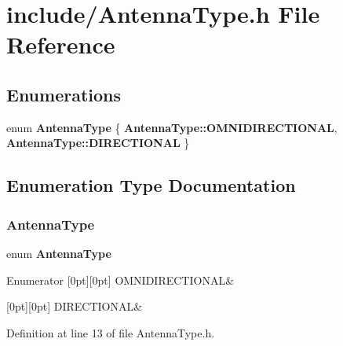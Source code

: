 \section{include/\+Antenna\+Type.h File Reference}
\label{_antenna_type_8h}
\subsection*{Enumerations}
\begin{DoxyCompactItemize}
\item 
enum \textbf{ Antenna\+Type} \{ \textbf{ Antenna\+Type\+::\+O\+M\+N\+I\+D\+I\+R\+E\+C\+T\+I\+O\+N\+AL}, 
\textbf{ Antenna\+Type\+::\+D\+I\+R\+E\+C\+T\+I\+O\+N\+AL}
 \}
\end{DoxyCompactItemize}


\subsection{Enumeration Type Documentation}
\mbox{\label{_antenna_type_8h_a7b678b5cb9dedc607131200119d96b16}} 
\subsubsection{AntennaType}
{\footnotesize\ttfamily enum \textbf{ Antenna\+Type}\hspace{0.3cm}{\ttfamily [strong]}}

\begin{DoxyEnumFields}{Enumerator}
[0pt][0pt]{}\mbox{\label{_antenna_type_8h_a7b678b5cb9dedc607131200119d96b16a8ff57fa72952e98025e600a041b8b8de}} 
O\+M\+N\+I\+D\+I\+R\+E\+C\+T\+I\+O\+N\+AL&\\
\hline

[0pt][0pt]{}\mbox{\label{_antenna_type_8h_a7b678b5cb9dedc607131200119d96b16ab6f2249394a4def60a78b342dcc925b9}} 
D\+I\+R\+E\+C\+T\+I\+O\+N\+AL&\\
\hline

\end{DoxyEnumFields}


Definition at line 13 of file Antenna\+Type.\+h.

